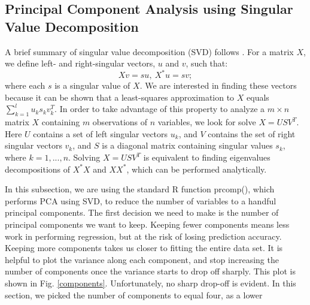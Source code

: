 \subsection{Principal Component Analysis using Singular Value Decomposition}
A brief summary of singular value decomposition (SVD) follows \cite{berrar}. For a matrix $X$, we define left- and right-singular vectors, $u$ and $v$, such that:
\begin{equation}
Xv=su,~X^*u = sv;
\end{equation}
where each $s$ is a singular value of $X$. We are interested in finding these vectors because it can be shown that a least-squares approximation to $X$ equals $\sum_{k=1}^{l}u_ks_kv_k^T$. In order to take advantage of this property to analyze a $m\times n$ matrix $X$ containing $m$ observations of $n$ variables, we look for solve $X = USV^T$. Here $U$ contains a set of left singular vectors $u_k$, and $V$ contains the set of right singular vectors $v_k$, and $S$ is a diagonal matrix containing singular values $s_k$, where $k = 1, ..., n$. Solving $X = USV^T$ is equivalent to finding eigenvalues decompositions of $X^*X$ and $XX^*$, which can be performed analytically. 

In this subsection, we are using the standard R function prcomp(), which performs PCA using SVD, to reduce the number of variables to a handful principal components. The first decision we need to make is the number of principal components we want to keep. Keeping fewer components means less work in performing regression, but at the risk of losing prediction accuracy. Keeping more components takes us closer to fitting the entire data set. It is helpful to plot the variance along each component, and stop increasing the number of components once the variance starts to drop off sharply. This plot is shown in Fig. \ref{components}. Unfortunately, no sharp drop-off is evident. In this section, we picked the number of components to equal four, as a lower 


